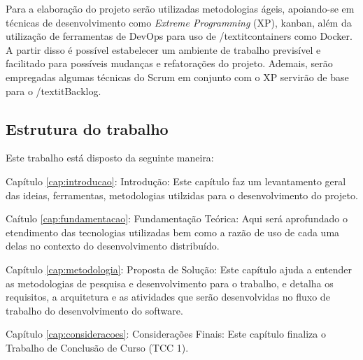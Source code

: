 Para a elaboração do projeto serão utilizadas metodologias ágeis, apoiando-se em técnicas de desenvolvimento como \textit{Extreme Programming} (XP), kanban, além da utilização de ferramentas de DevOps para uso de /textit{containers} como Docker. A partir disso é possível estabelecer um ambiente de trabalho previsível e facilitado para possíveis mudanças e refatorações do projeto. Ademais, serão empregadas algumas técnicas do Scrum em conjunto com o XP servirão de base para o /textit{Backlog}.

\subsection{Estrutura do trabalho}

Este trabalho está disposto da seguinte maneira:

Capítulo \ref{cap:introducao}: Introdução: Este capítulo faz um levantamento geral das ideias, ferramentas, metodologias utilzidas para o desenvolvimento do projeto.

Caítulo \ref{cap:fundamentacao}: Fundamentação Teórica: Aqui será aprofundado o etendimento das tecnologias utilizadas bem como a razão de uso de cada uma delas no contexto do desenvolvimento distribuído.

Capítulo \ref{cap:metodologia}: Proposta de Solução: Este capítulo ajuda a entender as metodologias de pesquisa e desenvolvimento para o trabalho, e detalha os requisitos, a arquitetura e as atividades que serão desenvolvidas no fluxo de trabalho do desenvolvimento do software.

Capítulo \ref{cap:consideracoes}: Considerações Finais: Este capítulo finaliza o Trabalho de Conclusão de Curso (TCC 1).